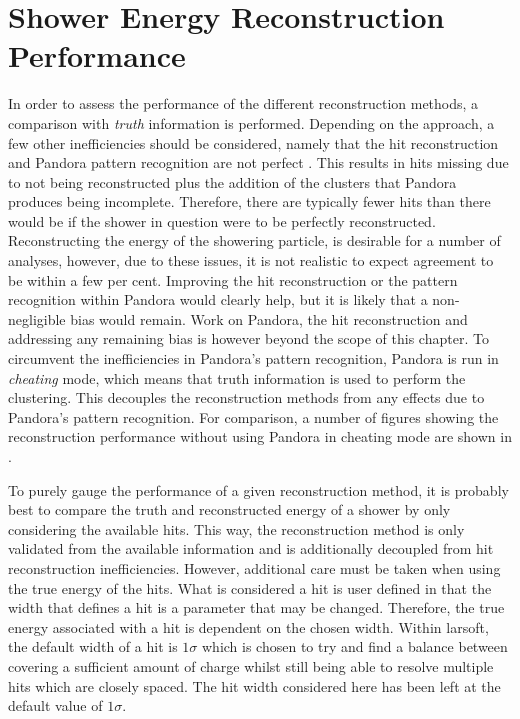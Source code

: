 \newpage
\section{Shower Energy Reconstruction Performance}

In order to assess the performance of the different reconstruction methods, a comparison with \textit{truth} information is performed. Depending on the approach, a few other inefficiencies should be considered, namely that the hit reconstruction and Pandora pattern recognition are not perfect \cite{Pandora_paper}. This results in hits missing due to not being reconstructed plus the addition of the clusters that Pandora produces being incomplete. Therefore, there are typically fewer hits than there would be if the shower in question were to be perfectly reconstructed. Reconstructing the energy of the showering particle, is desirable for a number of analyses, however, due to these issues, it is not realistic to expect agreement to be within a few per cent. Improving the hit reconstruction or the pattern recognition within Pandora would clearly help, but it is likely that a non-negligible bias would remain. Work on Pandora, the hit reconstruction and addressing any remaining bias is however beyond the scope of this chapter. To circumvent the inefficiencies in Pandora's pattern recognition, Pandora is run in \textit{cheating} mode, which means that truth information is used to perform the clustering. This decouples the reconstruction methods from any effects due to Pandora's pattern recognition. For comparison, a number of figures showing the reconstruction performance without using Pandora in cheating mode are shown in .

To purely gauge the performance of a given reconstruction method, it is probably best to compare the truth and reconstructed energy of a shower by only considering the available hits. This way, the reconstruction method is only validated from the available information and is additionally decoupled from hit reconstruction inefficiencies. However, additional care must be taken when using the true energy of the hits. What is considered a hit is user defined in that the width that defines a hit is a parameter that may be changed. Therefore, the true energy associated with a hit is dependent on the chosen width. Within \gls{larsoft}, the default width of a hit is $1\sigma$ which is chosen to try and find a balance between covering a sufficient amount of charge whilst still being able to resolve multiple hits which are closely spaced. The hit width considered here has been left at the default value of $1\sigma$. 

